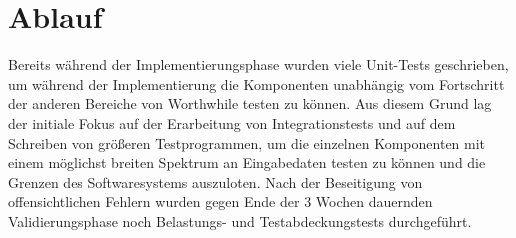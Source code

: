 \section{Ablauf}

Bereits während der Implementierungsphase wurden viele Unit-Tests geschrieben, um während der Implementierung die Komponenten unabhängig vom Fortschritt der anderen Bereiche von Worthwhile testen zu können. Aus diesem Grund lag der initiale Fokus auf der Erarbeitung von Integrationstests und auf dem Schreiben von größeren Testprogrammen, um die einzelnen Komponenten mit einem möglichst breiten Spektrum an Eingabedaten testen zu können und die Grenzen des Softwaresystems auszuloten. Nach der Beseitigung von offensichtlichen Fehlern wurden gegen Ende der 3 Wochen dauernden Validierungsphase noch Belastungs- und Testabdeckungstests durchgeführt.
